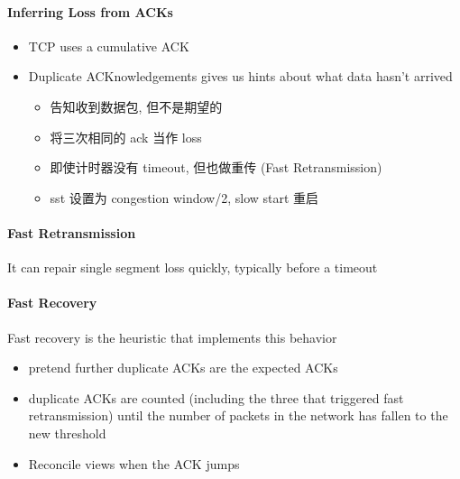 \paragraph{Inferring Loss from ACKs}\quad 
\begin{itemize}
    \item TCP uses a cumulative ACK
    \item Duplicate ACKnowledgements gives us hints about what data hasn't arrived
    \begin{itemize}
        \item 告知收到数据包, 但不是期望的
        \item 将三次相同的 ack 当作 loss
        \item 即使计时器没有 timeout, 但也做重传 (Fast Retransmission)
        \item sst 设置为 congestion window/2, slow start 重启
    \end{itemize}
\end{itemize}

\paragraph{Fast Retransmission}It can repair single segment loss quickly, typically before a timeout %


\paragraph{Fast Recovery}Fast recovery is the heuristic that implements this behavior
\begin{itemize}%
    \item pretend further duplicate ACKs are the expected ACKs
    \item duplicate ACKs are counted (including the three that
    triggered fast retransmission) until the number of packets in the
    network has fallen to the new threshold
    \item Reconcile views when the ACK jumps
\end{itemize}



